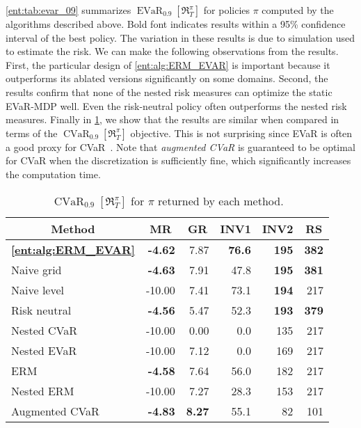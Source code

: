 \documentclass[twoside]{article}
\newcommand{\cvar}[2]{\operatorname{CVaR}_{#1} \left[#2\right]}
\newcommand{\evar}[2]{\operatorname{EVaR}_{#1} \left[#2\right]}
\theoremstyle{plain}
\theoremstyle{definition}
\theoremstyle{remark}
\renewcommand{\cite}[1]{\citep{#1}}
\begin{document}
\cref{ent:tab:evar_09} summarizes $\evar{0.9}{\mathfrak{R}^{\pi}_{T}}$ for policies $\pi$ computed by the algorithms described above. Bold font indicates results within a 95\% confidence interval of the best policy. The variation in these results is due to simulation used to estimate the risk. We can make the following observations from the results. First, the particular design of \cref{ent:alg:ERM_EVAR} is important because it outperforms its ablated versions significantly on some domains. Second, the results confirm that none of the nested risk measures can optimize the static EVaR-MDP well. Even the risk-neutral policy often outperforms the nested risk measures. Finally in \cref{ent:tab:cvar_09}, we show that the results are similar when compared in terms of the $\cvar{0.9}{\mathfrak{R}^{\pi}_{T}}$ objective. This is not surprising since EVaR is often a good proxy for CVaR~\cite{Ahmadi-Javid2012}. Note that \emph{augmented CVaR} is guaranteed to be optimal for CVaR when the discretization is sufficiently fine, which significantly increases the computation time.  

\begin{table}
\caption{$\cvar{0.9}{\mathfrak{R}^{\pi}_{T}}$ for $\pi$ returned by each method.} \label{ent:tab:cvar_09}
\centering
\begin{small}
\begin{tabular}{l|rrrrr}
  \toprule
 \multicolumn{1}{c|}{Method} & \multicolumn{1}{c}{MR} & \multicolumn{1}{c}{GR} & \multicolumn{1}{c}{INV1} & \multicolumn{1}{c}{INV2} & \multicolumn{1}{c}{RS}  \\
  \midrule
 \textbf{\cref{ent:alg:ERM_EVAR}} & \textbf{-4.62} & 7.87 & \textbf{76.6} & \textbf{195} & \textbf{382} \\ 
 Naive grid & \textbf{-4.63} & 7.91 & 47.8 & \textbf{195} & \textbf{381} \\ 
 Naive level & -10.00 & 7.41 & 73.1 & \textbf{194} & 217 \\ 
  \midrule
 Risk neutral & \textbf{-4.56} & 5.47 & 52.3 & \textbf{193} & \textbf{379} \\ 
 Nested CVaR & -10.00 & 0.00 & 0.0 & 135 & 217 \\ 
 Nested EVaR & -10.00 & 7.12 & 0.0 & 169 & 217 \\ 
 ERM & \textbf{-4.58} & 7.64 & 56.0 & 182 & 217 \\ 
 Nested ERM & -10.00 & 7.27 & 28.3 & 153 & 217 \\ 
 \midrule 
 Augmented CVaR & \textbf{-4.83} & \textbf{8.27} & 55.1 & 82 & 101 \\
\bottomrule
\end{tabular}
\end{small}
\end{table}
\end{document}
